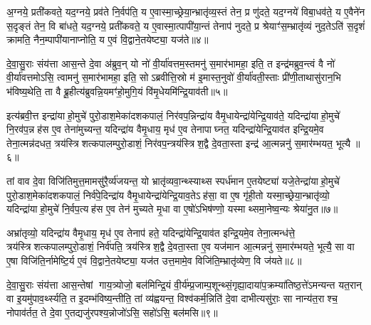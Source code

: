 अ॒ग्नये॒ प्रती॑कवते॒ यद॒ग्नये॒ प्रव॑ते नि॒र्वप॑ति॒ य ए॒वास्मा॒च्छ्रेया॒न्भ्रातृ॑व्य॒स्तं तेन॒ प्र णु॑दते॒ यद॒ग्नये॑ विबा॒धव॑ते॒ य ए॒वैने॑न स॒दृङ्तं तेन॒ वि बा॑धते॒ यद॒ग्नये॒ प्रती॑कवते॒ य ए॒वास्मा॒त्पापी॑या॒न्तं तेनाप॑ नुदते॒ प्र श्रेयाꣳ॑स॒म्भ्रातृ॑व्यं नुद॒तेऽति॑ स॒दृशं॑ क्रामति॒ नैन॒म्पापी॑यानाप्नोति॒ य ए॒वं वि॒द्वाने॒तयेष्ट्या॒ यज॑ते॥४॥

{\anuvakamend[{वृ॒णा॒म॒है॒ यत्पु॒रस्ता॒द्रख्षाꣳ॑सि वपेद॒ग्नये॑ विबा॒धव॑त ए॒वञ्च॒त्वारि॑ च॥१॥}]}

दे॒वा॒सु॒राः संय॑त्ता आस॒न्ते दे॒वा अ॑ब्रुव॒न् यो नो॑ वी॒र्या॑वत्तम॒स्तमनु॑ स॒मार॑भामहा॒ इति॒ त इन्द्र॑मब्रुव॒न्त्वं वै नो॑ वी॒र्या॑वत्तमोऽसि॒ त्वामनु॑ स॒मार॑भामहा॒ इति॒ सोऽब्रवीत्ति॒स्रो म॑ इ॒मास्त॒नुवो॑ वी॒र्या॑वती॒स्ताः प्री॑णी॒ताथासु॑रान॒भि भ॑विष्य॒थेति॒ ता वै ब्रू॒हीत्य॑ब्रुवन्नि॒यमꣳ॑हो॒मुगि॒यं वि॑मृ॒धेयमि॑न्द्रि॒याव॑ती॥५॥

इत्य॑ब्रवी॒त्त इन्द्रा॑याहो॒मुचे॑ पुरो॒डाश॒मेका॑दशकपालं॒ निर॑वप॒न्निन्द्रा॑य वैमृ॒धायेन्द्रा॑येन्द्रि॒याव॑ते॒ यदिन्द्रा॑याहो॒मुचे॑ नि॒रव॑प॒न्नह॑स ए॒व तेना॑मुच्यन्त॒ यदिन्द्रा॑य वैमृ॒धाय॒ मृध॑ ए॒व तेनापाघ्नत॒ यदिन्द्रा॑येन्द्रि॒याव॑त इन्द्रि॒यमे॒व तेना॒त्मन्न॑दधत॒ त्रय॑स्त्रिशत्कपालम्पुरो॒डाशं॒ निर॑वप॒न्त्रय॑स्त्रिश॒द्वै दे॒वता॒स्ता इन्द्र॑ आ॒त्मन्ननु॑ स॒मार॑म्भयत॒ भूत्यै॥६॥

तां वाव दे॒वा विजि॑तिमुत्त॒मामसु॑रै॒र्व्य॑जयन्त॒ यो भ्रातृ॑व्यवा॒न्थ्स्याथ्स स्पर्ध॑मान ए॒तयेष्ट्या॑ यजे॒तेन्द्रा॑याहो॒मुचे॑ पुरो॒डाश॒मेका॑दशकपालं॒ निर्व॑पे॒दिन्द्रा॑य वैमृ॒धायेन्द्रा॑येन्द्रि॒याव॒तेऽह॑सा॒ वा ए॒ष गृ॑ही॒तो यस्मा॒च्छ्रेया॒न्भ्रातृ॑व्यो॒ यदिन्द्रा॑याहो॒मुचे॑ नि॒र्वप॒त्यह॑स ए॒व तेन॑ मुच्यते मृ॒धा वा ए॒षो॑ऽभिष॑ण्णो॒ यस्माथ्समा॒नेष्व॒न्यः श्रेया॑नु॒त॥७॥

अभ्रा॑तृव्यो॒ यदिन्द्रा॑य वैमृ॒धाय॒ मृध॑ ए॒व तेनाप॑ हते॒ यदिन्द्रा॑येन्द्रि॒याव॑त इन्द्रि॒यमे॒व तेना॒त्मन्ध॑त्ते॒ त्रय॑स्त्रिशत्कपालम्पुरो॒डाशं॒ निर्व॑पति॒ त्रय॑स्त्रिश॒द्वै दे॒वता॒स्ता ए॒व यज॑मान आ॒त्मन्ननु॑ स॒मार॑म्भयते॒ भूत्यै॒ सा वा ए॒षा विजि॑ति॒र्नामेष्टि॒र्य ए॒वं वि॒द्वाने॒तयेष्ट्या॒ यज॑त उत्त॒मामे॒व विजि॑ति॒म्भ्रातृ॑व्येण॒ वि ज॑यते॥८॥

{\anuvakamend[{इ॒न्द्रि॒याव॑ती॒ भूत्या॑ उ॒तैका॒न्नप॑ञ्चा॒शच्च॑॥२॥}]}

दे॒वा॒सु॒राः संय॑त्ता आस॒न्तेषां गाय॒त्र्योजो॒ बल॑मिन्द्रि॒यं वी॒र्य॑म्प्र॒जाम्प॒शून्थ्सं॒गृह्या॒दाया॑प॒क्रम्या॑तिष्ठ॒त्ते॑ऽमन्यन्त यत॒रान् वा इ॒यमु॑पाव॒र्थ्स्यति॒ त इ॒दम्भ॑विष्य॒न्तीति॒ तां व्य॑ह्वयन्त॒ विश्व॑कर्म॒न्निति॑ दे॒वा दाभीत्यसु॑राः॒ सा नान्य॑त॒राश्च॒ नोपाव॑र्तत॒ ते दे॒वा ए॒तद्यजु॑रपश्य॒न्नोजो॑ऽसि॒ सहो॑ऽसि॒ बल॑मसि॥९॥


